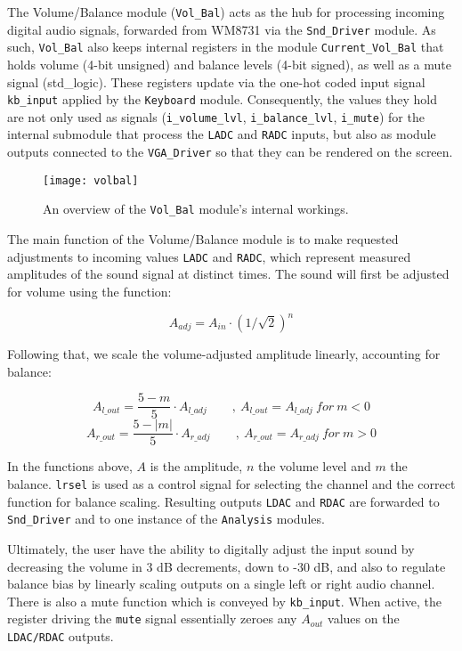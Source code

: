 The Volume/Balance module (\verb=Vol_Bal=) acts as the hub for processing incoming digital audio signals, forwarded from WM8731 via the \verb=Snd_Driver= module. As such, \verb=Vol_Bal= also keeps internal registers in the module \verb=Current_Vol_Bal= that holds volume (4-bit unsigned) and balance levels (4-bit signed), as well as a mute signal (std\_logic). These registers update via the one-hot coded input signal \verb=kb_input= applied by the \verb=Keyboard= module. Consequently, the values they hold are not only used as signals (\verb=i_volume_lvl=, \verb=i_balance_lvl=, \verb=i_mute=) for the internal submodule that process the \verb=LADC= and \verb=RADC= inputs, but also as module outputs connected to the \verb=VGA_Driver= so that they can be rendered on the screen.

\begin{figure}[H]
  \centering
  \texttt{[image: volbal]}
  \caption{An overview of the \texttt{Vol\_Bal} module's internal workings.}
  \label{fig:vol_bal}
\end{figure}

The main function of the Volume/Balance module is to make requested adjustments to incoming values \verb=LADC= and \verb=RADC=, which represent measured amplitudes of the sound signal at distinct times. The sound will first be adjusted for volume using the function:

$$A_{adj} = A_{in} \cdot (1/\sqrt{2})^n$$

Following that, we scale the volume-adjusted amplitude linearly, accounting for balance:

$$A_{l\_out} = \frac{5 - m}{5} \cdot A_{l\_adj}\qquad,\ A_{l\_out} = A_{l\_adj}\ for\ m < 0$$
$$A_{r\_out} = \frac{5 - |m|}{5} \cdot A_{r\_adj}\qquad,\ A_{r\_out} = A_{r\_adj}\ for\ m > 0$$


In the functions above, $A$ is the amplitude, $n$ the volume level and $m$ the balance. \verb=lrsel= is used as a control signal for selecting the channel and the correct function for balance scaling. Resulting outputs \verb=LDAC= and \verb=RDAC= are forwarded to \verb=Snd_Driver= and to one instance of the \verb=Analysis= modules.

Ultimately, the user have the ability to digitally adjust the input sound by decreasing the volume in 3 dB decrements, down to -30 dB, and also to regulate balance bias by linearly scaling outputs on a single left or right audio channel. There is also a mute function which is conveyed by \verb=kb_input=. When active, the register driving the \verb=mute= signal essentially zeroes any $A_{out}$ values on the \verb=LDAC/RDAC= outputs.


